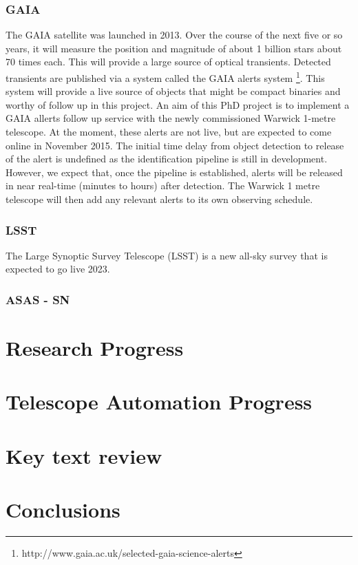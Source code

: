 \documentclass[a4paper,fleqn,usenatbib]{mnras}
\begin{document}
\subsubsection{GAIA}
The GAIA satellite was launched in 2013. Over the course of the next five or so years, it will measure the position and magnitude of about 1 billion stars about 70 times each. This will provide a large source of optical transients. Detected transients are published via a system called the GAIA alerts system  \footnote{http://www.gaia.ac.uk/selected-gaia-science-alerts}. This system will provide a live source of objects that might be compact binaries and worthy of follow up in this project. An aim of this PhD project is to implement a GAIA allerts follow up service with the newly commissioned Warwick 1-metre telescope.  At the moment, these alerts are not live, but are expected to come online in November 2015. The initial time delay from object detection to release of the alert is undefined as the identification pipeline is still in development. However, we expect that, once the pipeline is established, alerts will be released in near real-time (minutes to hours) after detection. The Warwick 1 metre telescope will then add any relevant alerts to its own observing schedule.  


\subsubsection{LSST}
The Large Synoptic Survey Telescope (LSST) is a new all-sky survey that is expected to go live 2023. 

\subsubsection{ASAS - SN}

\section{Research Progress}

\section{Telescope Automation Progress}

\section{Key text review}

\section{Conclusions}
\end{document}
